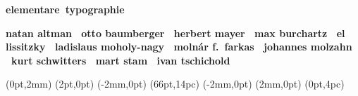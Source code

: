 \documentclass{article}
\begin{document}
  \NewCoffin \result
  \NewCoffin \aaa
  \NewCoffin \bbb
  \NewCoffin \ccc
  \NewCoffin \ddd
  \NewCoffin \eee
  \NewCoffin \fff
  \NewCoffin {}
  \NewCoffin {}
  \NewCoffin {}

\SetHorizontalCoffin \result {}
\SetHorizontalCoffin {}
\SetHorizontalCoffin {}
\SetHorizontalCoffin {}
\SetHorizontalCoffin {}
\SetVerticalCoffin \eee {180pt}
                 {\raggedleft\fontsize{31}{36}\sffamily\bfseries 
                      elementare\                          typographie}
\SetVerticalCoffin \fff {140pt}
                 {\raggedright \fontsize{13}{14}\sffamily\bfseries 
                       natan altman \                           otto baumberger \                           herbert mayer \                           max burchartz \                           el lissitzky \                           ladislaus moholy-nagy \                           moln\'ar f.~farkas \                           johannes molzahn \                           kurt schwitters \                           mart stam \                           ivan tschichold}

\RotateCoffin {}
\RotateCoffin {}

\SetHorizontalCoffin {}
\SetHorizontalCoffin {}
\SetHorizontalCoffin {}


\JoinCoffins \result                \aaa 
\JoinCoffins {} (0pt,2mm)
\JoinCoffins {} \bbb     [B,r](2pt,0pt)
\JoinCoffins {} (-2mm,0pt)
\JoinCoffins {} \ccc     [B,l](66pt,14pc)
\JoinCoffins {} \fff     [t,r](-2mm,0pt)
\JoinCoffins {} (2mm,0pt)
\JoinCoffins {} \eee     [B,r]
\JoinCoffins {} \ddd     [B,r](0pt,4pc)
\TypesetCoffin \result
\end{document}
